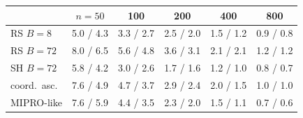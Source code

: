\begin{tabular}{lccccc}
\toprule
 & $n{=}50$ & 100 & 200 & 400 & 800 \\
\midrule
RS $B{=}8$ & 5.0 / 4.3 & 3.3 / 2.7 & 2.5 / 2.0 & 1.5 / 1.2 & 0.9 / 0.8 \\
RS $B{=}72$ & 8.0 / 6.5 & 5.6 / 4.8 & 3.6 / 3.1 & 2.1 / 2.1 & 1.2 / 1.2 \\
SH $B{=}72$ & 5.8 / 4.2 & 3.0 / 2.6 & 1.7 / 1.6 & 1.2 / 1.0 & 0.8 / 0.7 \\
coord.\ asc. & 7.6 / 4.9 & 4.7 / 3.7 & 2.9 / 2.4 & 2.0 / 1.5 & 1.0 / 1.0 \\
MIPRO-like & 7.6 / 5.9 & 4.4 / 3.5 & 2.3 / 2.0 & 1.5 / 1.1 & 0.7 / 0.6 \\
\bottomrule
\end{tabular}
